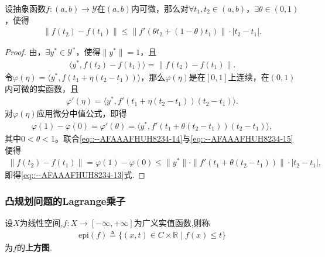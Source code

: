 \documentclass[../../main.tex]{subfiles}%
\begin{document}
\begin{theorem}
设抽象函数$f: (a,b) \to \mathscr{Y}$在$(a,b)$内可微，那么对$\forall t_1, t_2 \in (a,b)$，$\exists \theta \in (0,1)$，使得
\begin{align}
\|f(t_2) - f(t_1)\| \leqslant \|f'(\theta t_2 + (1 - \theta)t_1)\| \cdot |t_2 - t_1|.
\label{eq::--AFAAAFHUH8234-13}
\end{align}
\end{theorem}
\begin{proof}

由，$\exists y^* \in \mathscr{Y}^*$，使得$\|y^*\| = 1$，且
\begin{align}
\langle y^*, f(t_2) - f(t_1) \rangle = \|f(t_2) - f(t_1)\|.
\label{eq::--AFAAAFHUH8234-14}
\end{align}
令$\varphi(\eta) = \langle y^*, f(t_1 + \eta(t_2 - t_1)) \rangle$，那么$\varphi(\eta)$是在$[0,1]$上连续，在$(0,1)$内可微的实函数，且
\begin{align*}
\varphi'(\eta) = \langle y^*, f'(t_1 + \eta(t_2 - t_1))(t_2 - t_1) \rangle.
\end{align*}
对$\varphi(\eta)$应用微分中值公式，即得
\begin{align}
\varphi(1) - \varphi(0) = \varphi'(\theta)  
= \langle y^*, f'(t_1 + \theta(t_2 - t_1))(t_2 - t_1) \rangle,
\label{eq::--AFAAAFHUH8234-15}
\end{align}
其中$0 < \theta < 1$。联合\eqref{eq::--AFAAAFHUH8234-14}与\eqref{eq::--AFAAAFHUH8234-15}便得
\begin{align*}
\|f(t_2) - f(t_1)\| = \varphi(1) - \varphi(0) 
\leqslant \|y^*\| \cdot \|f'(t_1 + \theta(t_2 - t_1))\| \cdot |t_2 - t_1|,
\end{align*}
即得\eqref{eq::--AFAAAFHUH8234-13}式.

\end{proof}

\subsubsection{凸规划问题的Lagrange乘子}

\begin{definition}[上方图]
设$X$为线性空间,$f:X\to [-\infty,+\infty]$为广义实值函数,则称
\begin{align*}
\mathrm{epi}(f) \triangleq \{ (x,t) \in C \times \mathbb{R} \mid f(x) \leqslant t \}
\end{align*}
为$f$的\textbf{上方图}.
\end{definition}
\end{document}
